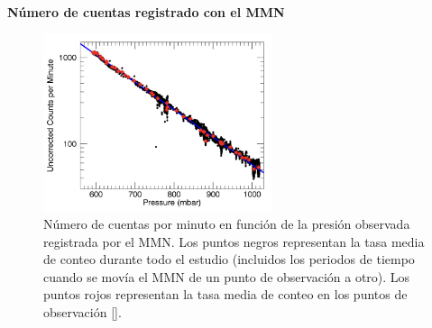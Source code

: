     \begin{frame}{} %
        \justifying %
        \vspace*{-0.3cm} %

        \begin{tcolorbox}[colback=custombgcolor9, coltext=customfgcolor2,
                      colframe=custombgcolor9, %
                      width=\textwidth,       %
                      boxrule=1pt,            %
                      top=0.1mm, bottom=0.1mm,     %
                      sharp corners=all,     %
                      halign=center,         %
                      valign=center,         %
                      ]
            \textbf{Número de cuentas registrado con el MMN}        
        \end{tcolorbox}
        \vspace*{-0.3cm} %
        
        \begin{figure}
            \centering
            \includegraphics[width=0.6\textwidth]{Figures/rate-MMN.png}
            \caption{\tiny Número de cuentas por minuto en función de la presión observada registrada por el MMN. Los puntos negros representan la tasa media de conteo durante todo el estudio (incluidos los periodos de tiempo cuando se movía el MMN de un punto de observación a otro). Los puntos rojos representan la tasa media de conteo en los puntos de observación [\cite{lara2016}].}
        \end{figure}
    \end{frame}    